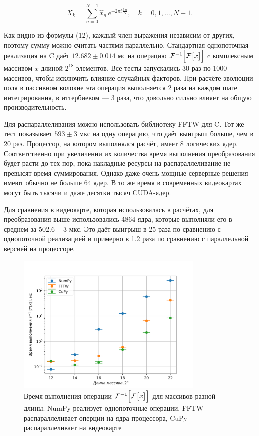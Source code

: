 \documentclass[12pt]{article}
\begin{document}
\begin{equation}
    X_k
    =\sum_{n=0}^{N-1}\hat{x}_n\,e^{-2\pi i\frac{k\,n}{N}},
    \quad k=0,1,\dots,N-1.
    \label{eq:equation}
\end{equation}

Как видно из формулы (12), каждый член выражения независим от других, поэтому сумму можно считать частями параллельно.
Стандартная однопоточная реализация на C даёт $12.682 \pm 0.014$ мс на операцию
$\mathcal{F}^{-1} \Bigl[ \mathcal{F} \bigl[ x \bigr] \Bigr]$ c комплексным массивом $x$ длиной $2^{18}$ элементов.
Все тесты запускались 30 раз по 1000 массивов, чтобы исключить влияние случайных факторов. При расчёте эволюции поля
в пассивном волокне эта операция выполняется 2 раза на каждом шаге интегрирования, в иттербиевом — 3 раза, что
довольно сильно влияет на общую производительность.

Для распараллеливания можно использовать библиотеку FFTW для C. Тот же тест показывает $593 \pm 3$ мкс на одну
операцию, что даёт выигрыш больше, чем в 20 раз. Процессор, на котором выполнялся расчёт, имеет 8 логических ядер.
Соответственно при увеличении их количества время выполнения преобразования будет расти до тех пор, пока накладные
ресурсы на распараллеливание не превысят время суммирования. Однако даже очень мощные серверные решения имеют обычно
не больше 64 ядер. В то же время в современных видеокартах могут быть тысячи и даже десятки тысяч CUDA-ядер.

Для сравнения в видеокарте, которая использовалась в расчётах, для преобразования выше использовались 4864 ядра,
которые выполняли его в среднем за $502.6 \pm 3$ мкс. Это даёт выигрыш в 25 раза по сравнению с однопоточной
реализацией и примерно в 1.2 раза по сравнению с параллельной версией на процессоре.

\begin{figure}[h]
    \centering
    \includegraphics[trim=0 0 0 0, width=0.8\textwidth]{Images/Время выполнения}
    \caption{Время выполнения операции $\mathcal{F}^{-1} \Bigl[ \mathcal{F} \bigl[ x \bigr] \Bigr]$ для массивов разной длины. NumPy реализует однопоточные операции, FFTW распараллеливает оперции на ядра процессора, CuPy распараллеливает на видеокарте}
    \label{fig:rotated}
\end{figure}
\end{document}

